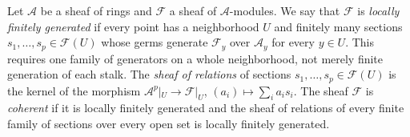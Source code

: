 Let $\mathcal A$ be a sheaf of rings and $\mathcal F$ a sheaf of $\mathcal A$-modules. We say that $\mathcal F$ is \emph{locally finitely generated} if every point has a neighborhood $U$ and finitely many sections $s_1,\ldots,s_p\in\mathcal F(U)$ whose germs generate $\mathcal F_y$ over $\mathcal A_y$ for every $y\in U$. This requires one family of generators on a whole neighborhood, not merely finite generation of each stalk. The \emph{sheaf of relations} of sections $s_1,\ldots,s_p\in\mathcal F(U)$ is the kernel of the morphism $\mathcal A^p|_U\to\mathcal F|_U$, $(a_i)\mapsto\sum_ia_is_i$. The sheaf $\mathcal F$ is \emph{coherent} if it is locally finitely generated and the sheaf of relations of every finite family of sections over every open set is locally finitely generated.

